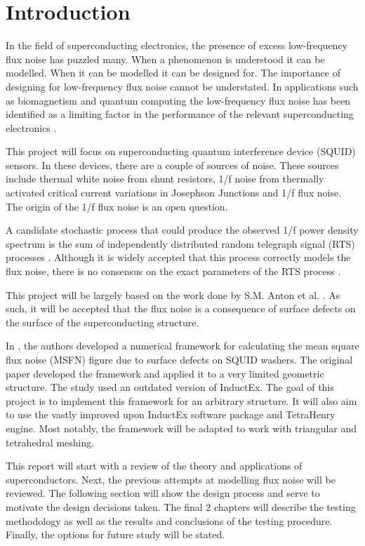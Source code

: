 \graphicspath{{introduction/fig/}}

\chapter{Introduction}
\label{chap:introduction}

In the field of superconducting electronics, the presence of excess low-frequency flux noise has puzzled many. When a phenomenon is understood it can be modelled. When it can be modelled it can be designed for. The importance of designing for low-frequency flux noise cannot be understated. In applications such as biomagnetism and quantum computing the low-frequency flux noise has been identified as a limiting factor in the performance of the relevant superconducting electronics \cite{KochModel}. \par
This project will focus on superconducting quantum interference device (SQUID) sensors. In these devices, there are a couple of sources of noise. These sources include thermal white noise from shunt resistors, 1/f noise from thermally activated critical current variations in Josephson Junctions and 1/f flux noise. The origin of the 1/f flux noise is an open question. \par

A candidate stochastic process that could produce the observed 1/f power density spectrum is the sum of independently distributed random telegraph signal (RTS) processes \cite{fluxNoiseSquidsStevenAnton}. Although it is widely accepted that this process correctly models the flux noise, there is no consensus on the exact parameters of the RTS process \cite{fluxNoiseSquidsStevenAnton}. \par
This project will be largely based on the work done by S.M. Anton et al. \cite{fluxNoiseSquidsStevenAnton}. As such, it will be accepted that the flux noise is a consequence of surface defects on the surface of the superconducting structure. \par
In \cite{fluxNoiseSquidsStevenAnton}, the authors developed a numerical framework for calculating the mean square flux noise (MSFN) figure due to surface defects on SQUID washers. The original paper developed the framework and applied it to a very limited geometric structure. The study used an outdated version of InductEx. The goal of this project is to implement this framework for an arbitrary structure. It will also aim to use the vastly improved upon InductEx software package and TetraHenry engine. Most notably, the framework will be adapted to work with triangular and tetrahedral meshing. \par
This report will start with a review of the theory and applications of superconductors. Next, the previous attempts at modelling flux noise will be reviewed. The following section will show the design process and serve to motivate the design decisions taken. The final 2 chapters will describe the testing methodology as well as the results and conclusions of the testing procedure. Finally, the options for future study will be stated. 
